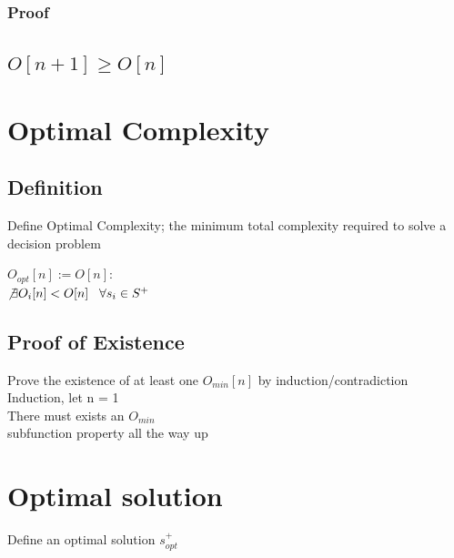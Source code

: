 \documentclass[11pt]{article}
\begin{document}
\subsubsection{Proof}


\subsection{$O[n+1] \geq O[n]$}





\newpage
\section{Optimal Complexity}

\subsection{Definition}
Define Optimal Complexity; the minimum total complexity required to solve a decision problem
\begin{center}
$O_{opt}[n] := O[n]:$
\\ \vspace{2mm}
$\not \exists O_i\lbrack n \rbrack < O[n] \hspace{3mm} \forall s_i \in S^+$
\end{center}

\subsection{Proof of Existence}
Prove the existence of at least one $O_{min}[n]$ by induction/contradiction\\
Induction, let n = 1\\
There must exists an $O_{min}$\\
subfunction property all the way up








\section{Optimal solution}
Define an optimal solution $s_{opt}^+$
\end{document}
